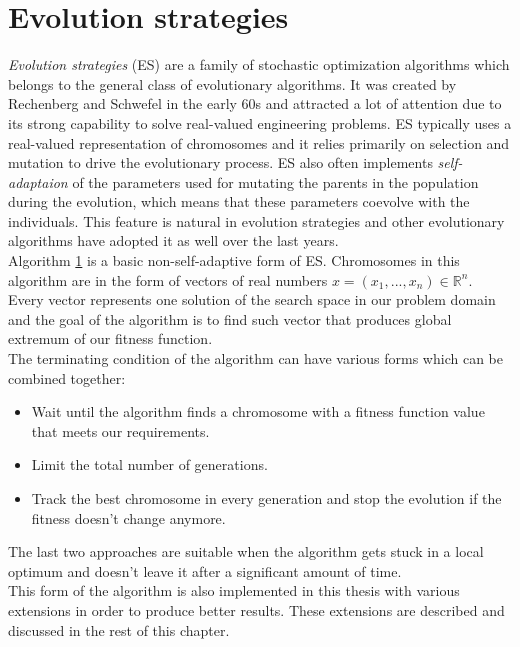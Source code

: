 \section{Evolution strategies} \label{evolution-strategies}
\textit{Evolution strategies} (ES) are a family of stochastic optimization algorithms which belongs to the general class of evolutionary algorithms. It was created by Rechenberg and Schwefel in the early 60s and attracted a lot of attention due to its strong capability to solve real-valued engineering problems. ES typically uses a real-valued representation of chromosomes and it relies primarily on selection and mutation to drive the evolutionary process. ES also often implements \textit{self-adaptaion} of the parameters used for mutating the parents in the population during the evolution, which means that these parameters coevolve with the individuals. This feature is natural in evolution strategies and other evolutionary algorithms have adopted it as well over the last years.\\
Algorithm \ref{evolution-strategies} is a basic non-self-adaptive form of ES. Chromosomes in this algorithm are in the form of vectors of real numbers $x = (x_1,...,x_n) \in \mathbb{R}^n$. Every vector represents one solution of the search space in our problem domain and the goal of the algorithm is to find such vector that produces global extremum of our fitness function.\\
The terminating condition of the algorithm can have various forms which can be combined together:

 \begin{itemize}
    \item Wait until the algorithm finds a chromosome with a fitness function value that meets our requirements.
    \item Limit the total number of generations.
    \item Track the best chromosome in every generation and stop the evolution if the fitness doesn't change anymore.
 \end{itemize}

 The last two approaches are suitable when the algorithm gets stuck in a local optimum and doesn't leave it after a significant amount of time.\\
This form of the algorithm is also implemented in this thesis with various extensions in order to produce better results. These extensions are described and discussed in the rest of this chapter.

